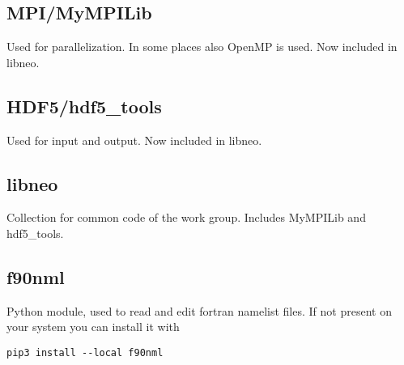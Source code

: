 \subsection{MPI/MyMPILib}
Used for parallelization. In some places also OpenMP is used.
Now included in libneo.

\subsection{HDF5/hdf5\_tools}
Used for input and output.
Now included in libneo.

\subsection{libneo}
Collection for common code of the work group.
Includes MyMPILib and hdf5\_tools.

\subsection{f90nml}
Python module, used to read and edit fortran namelist files.
If not present on your system you can install it with
\begin{verbatim}
pip3 install --local f90nml
\end{verbatim}

